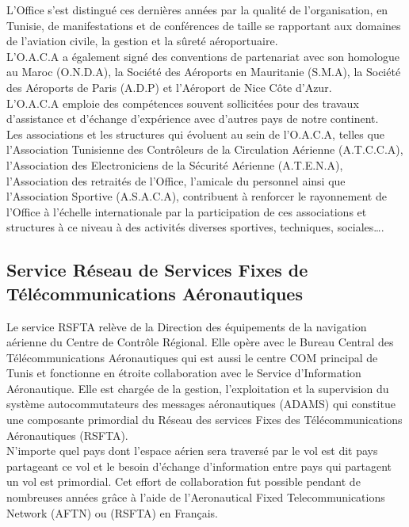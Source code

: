 L’Office s’est distingué ces dernières années par la qualité de l’organisation, en Tunisie, de manifestations et de conférences de taille se rapportant aux domaines de l’aviation civile, la gestion et la sûreté aéroportuaire.\\

L’O.A.C.A a également signé des conventions de partenariat avec son homologue au Maroc (O.N.D.A), la Société des Aéroports en Mauritanie (S.M.A), la Société des Aéroports de Paris (A.D.P) et l’Aéroport de Nice Côte d’Azur.\\

L'O.A.C.A emploie des compétences souvent sollicitées pour des travaux d’assistance et d’échange d’expérience avec d’autres pays de notre continent.\\

Les associations et les structures qui évoluent au sein de l’O.A.C.A, telles que l'Association Tunisienne des Contrôleurs de la Circulation Aérienne (A.T.C.C.A), l'Association des Electroniciens de la Sécurité Aérienne (A.T.E.N.A), l'Association des retraités de l'Office, l'amicale du personnel ainsi que l'Association Sportive (A.S.A.C.A), contribuent à renforcer le rayonnement de l'Office à l'échelle internationale par la participation de ces associations et structures à ce niveau à des activités diverses sportives, techniques, sociales….\\

\subsection{Service Réseau de Services Fixes de Télécommunications Aéronautiques}

Le service RSFTA  relève de la Direction des équipements de la navigation aérienne du Centre de Contrôle Régional. Elle  opère avec le Bureau Central des Télécommunications Aéronautiques qui est aussi le centre COM principal de Tunis et fonctionne en étroite collaboration avec le Service d’Information Aéronautique. Elle est chargée de la gestion, l’exploitation et la supervision du système autocommutateurs des messages aéronautiques (ADAMS) qui constitue une composante primordial du Réseau des services Fixes des Télécommunications Aéronautiques (RSFTA). \\

N’importe quel pays dont l'espace aérien sera traversé par le vol est dit pays partageant  ce vol et le besoin d'échange d'information entre pays qui partagent un vol est primordial.
Cet effort de collaboration fut possible pendant de nombreuses années grâce à l'aide de l’Aeronautical Fixed Telecommunications Network (AFTN) ou (RSFTA) en Français. \\
